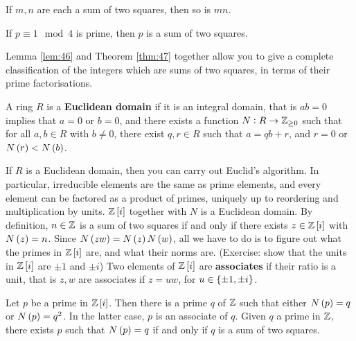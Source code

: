 \begin{lemma}
\label{lem:46}
If $ m, n $ are each a sum of two squares, then so is $ mn $.
\end{lemma}

\begin{theorem}
\label{thm:47}
If $ p \equiv 1 \mod 4 $ is prime, then $ p $ is a sum of two squares.
\end{theorem}

Lemma \ref{lem:46} and Theorem \ref{thm:47} together allow you to give a complete classification of the integers which are sums of two squares, in terms of their prime factorisations.

\begin{definition}
A ring $ R $ is a \textbf{Euclidean domain} if it is an integral domain, that is $ ab = 0 $ implies that $ a = 0 $ or $ b = 0 $, and there exists a function $ N : R \to \mathbb{Z}_{\ge 0} $ such that for all $ a, b \in R $ with $ b \ne 0 $, there exist $ q, r \in R $ such that $ a = qb + r $, and $ r = 0 $ or $ N\br{r} < N\br{b} $.
\end{definition}

If $ R $ is a Euclidean domain, then you can carry out Euclid's algorithm. In particular, irreducible elements are the same as prime elements, and every element can be factored as a product of primes, uniquely up to reordering and multiplication by units. $ \Z\sbr{i} $ together with $ N $ is a Euclidean domain. By definition, $ n \in \mathbb{Z} $ is a sum of two squares if and only if there exists $ z \in \Z\sbr{i} $ with $ N\br{z} = n $. Since $ N\br{zw} = N\br{z}N\br{w} $, all we have to do is to figure out what the primes in $ \Z\sbr{i} $ are, and what their norms are. (Exercise: show that the units in $ \Z\sbr{i} $ are $ \pm 1 $ and $ \pm i $) Two elements of $ \Z\sbr{i} $ are \textbf{associates} if their ratio is a unit, that is $ z, w $ are associates if $ z = uw $, for $ u \in \cbr{\pm 1, \pm i} $.


\begin{lemma}
Let $ p $ be a prime in $ \Z\sbr{i} $. Then there is a prime $ q $ of $ \mathbb{Z} $ such that either $ N\br{p} = q $ or $ N\br{p} = q^2 $. In the latter case, $ p $ is an associate of $ q $. Given $ q $ a prime in $ \mathbb{Z} $, there exists $ p $ such that $ N\br{p} = q $ if and only if $ q $ is a sum of two squares.
\end{lemma}

